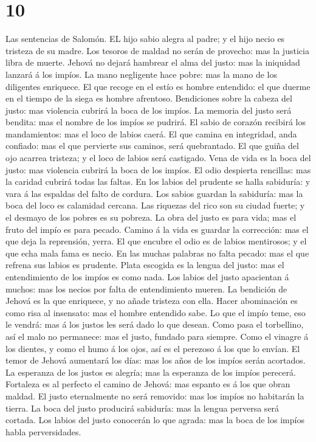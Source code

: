 \hypertarget{section-9}{%
\section{10}\label{section-9}}

 Las sentencias de Salomón. EL hijo sabio alegra al padre; y
el hijo necio es tristeza de su madre.  Los tesoros de
maldad no serán de provecho: mas la justicia libra de muerte.
 Jehová no dejará hambrear el alma del justo: mas la
iniquidad lanzará á los impíos.  La mano negligente hace
pobre: mas la mano de los diligentes enriquece.  El que
recoge en el estío es hombre entendido: el que duerme en el tiempo de la
siega es hombre afrentoso.  Bendiciones sobre la cabeza del
justo: mas violencia cubrirá la boca de los impíos.  La
memoria del justo será bendita: mas el nombre de los impíos se pudrirá.
 El sabio de corazón recibirá los mandamientos: mas el loco
de labios caerá.  El que camina en integridad, anda
confiado: mas el que pervierte sus caminos, será quebrantado.
 El que guiña del ojo acarrea tristeza; y el loco de labios
será castigado.  Vena de vida es la boca del justo: mas
violencia cubrirá la boca de los impíos.  El odio despierta
rencillas: mas la caridad cubrirá todas las faltas.  En los
labios del prudente se halla sabiduría: y vara á las espaldas del falto
de cordura.  Los sabios guardan la sabiduría: mas la boca
del loco es calamidad cercana.  Las riquezas del rico son
su ciudad fuerte; y el desmayo de los pobres es su pobreza.
 La obra del justo es para vida; mas el fruto del impío es
para pecado.  Camino á la vida es guardar la corrección:
mas el que deja la reprensión, yerra.  El que encubre el
odio es de labios mentirosos; y el que echa mala fama es necio.
 En las muchas palabras no falta pecado: mas el que refrena
sus labios es prudente.  Plata escogida es la lengua del
justo: mas el entendimiento de los impíos es como nada. 
Los labios del justo apacientan á muchos: mas los necios por falta de
entendimiento mueren.  La bendición de Jehová es la que
enriquece, y no añade tristeza con ella.  Hacer abominación
es como risa al insensato: mas el hombre entendido sabe. 
Lo que el impío teme, eso le vendrá: mas á los justos les será dado lo
que desean.  Como pasa el torbellino, así el malo no
permanece: mas el justo, fundado para siempre.  Como el
vinagre á los dientes, y como el humo á los ojos, así es el perezoso á
los que lo envían.  El temor de Jehová aumentará los días:
mas los años de los impíos serán acortados.  La esperanza
de los justos es alegría; mas la esperanza de los impíos perecerá.
 Fortaleza es al perfecto el camino de Jehová: mas espanto
es á los que obran maldad.  El justo eternalmente no será
removido: mas los impíos no habitarán la tierra.  La boca
del justo producirá sabiduría: mas la lengua perversa será cortada.
 Los labios del justo conocerán lo que agrada: mas la boca
de los impíos habla perversidades.

